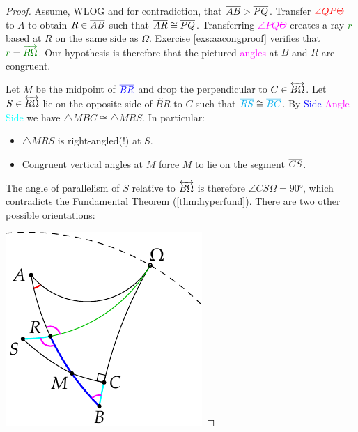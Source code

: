 \begin{proof}
	Assume, WLOG and for contradiction, that $\overline{AB}>\overline{PQ}$. Transfer $\textcolor{red}{\angle QP\Theta}$ to $A$ to obtain $R\in\overline{AB}$ such that $\overline{AR}\cong\overline{PQ}$. Transferring \textcolor{Magenta}{$\angle PQ\Theta$} creates a ray \textcolor{Green}{$r$} based at $R$ on the same side as $\Omega$. Exercise \ref{exs:aacongproof} verifies that $\textcolor{Green}{r}=\textcolor{Green}{\ray{R\Omega}}$. Our hypothesis is therefore that the pictured \textcolor{Magenta}{angles} at $B$ and $R$ are congruent.\par
	\begin{minipage}[t]{0.7\linewidth}\vspace{0pt}
		Let $M$ be the midpoint of $\textcolor{blue}{\overline{BR}}$ and drop the perpendicular to $C\in\overleftrightarrow{B\Omega}$.\smallbreak
		Let $S\in\overleftrightarrow{R\Omega}$ lie on the opposite side of $\overleftrightarrow{BR}$ to $C$ such that $\textcolor{cyan}{\overline{RS}}\cong \textcolor{cyan}{\overline{BC}}$.\smallbreak
		By \textcolor{blue}{Side}-\textcolor{Magenta}{Angle}-\textcolor{cyan}{Side} we have $\triangle MBC\cong\triangle MRS$. In particular:
		\begin{itemize}
		  \item $\triangle MRS$ is right-angled(!) at $S$.
		  \item Congruent vertical angles at $M$ force $M$ to lie on the segment $\overline{CS}$.
		\end{itemize}
		The angle of parallelism of $S$ relative to $\overleftrightarrow{B\Omega}$ is therefore $\angle CS\Omega=\ang{90}$, which contradicts the Fundamental Theorem (\ref{thm:hyperfund}).\medbreak
		There are two other possible orientations:
	\end{minipage}
	\hfill
	\begin{minipage}[t]{0.29\linewidth}\vspace{0pt}
		\flushright\includegraphics{basic-ext5}

\end{minipage}
\end{proof}
